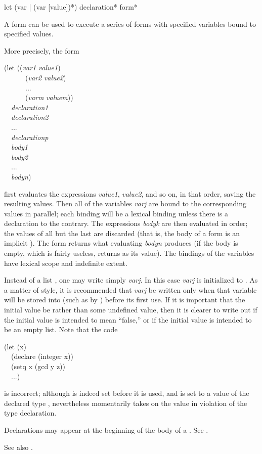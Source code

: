 \begin{defspec}
let ({var | (var [value])}*) {declaration}* {form}*

A  form can be used to execute a series of forms
with specified variables bound to specified values.

More precisely, the form
\begin{lisp}
(let ((\emph{var1} \emph{value1}) \\
~~~~~~(\emph{var2} \emph{value2}) \\
~~~~~~... \\
~~~~~~(\emph{varm} \emph{valuem})) \\
~~\emph{declaration1} \\
~~\emph{declaration2} \\
~~... \\
~~\emph{declarationp} \\
~~\emph{body1} \\
~~\emph{body2} \\
~~... \\
~~\emph{bodyn})
\end{lisp}
first evaluates the expressions \emph{value1}, \emph{value2}, and so on,
in that order, saving the resulting values.
Then all of the variables \emph{varj} are bound to the corresponding
values in parallel; each binding will be a lexical binding unless
there is a  declaration to the contrary.
The expressions \emph{bodyk} are then evaluated
in order; the values of all but the last are discarded
(that is, the body of a  form is an implicit ).
The  form returns what evaluating \emph{bodyn} produces (if the
body is empty, which is fairly useless,  returns {\false} as its value).
The bindings of the variables have lexical scope and indefinite extent.

Instead of a list , one may write simply
\emph{varj}.  In this case \emph{varj} is initialized to {\false}.  As a matter
of style, it is recommended that \emph{varj} be written only when that
variable will be stored into (such as by ) before its first
use.  If it is important that the initial value be {\false} rather than
some undefined value, then it is clearer to write out
 if the initial value is intended to mean ``false,'' or
 if the initial value is intended to be an empty
list.  Note that the code
\begin{lisp}
(let (x) \\
~~(declare (integer x)) \\
~~(setq x (gcd y z)) \\
~~...)
\end{lisp}
is incorrect; although  is indeed set before it is used,
and is set to a value of the declared type , nevertheless
 momentarily takes on the value {\nil} in violation of the type
declaration.

Declarations may appear at the beginning of the body of a .
See .

See also .
\end{defspec}

